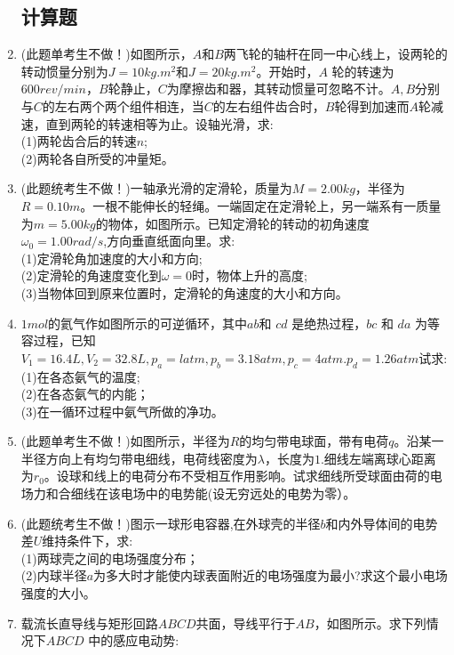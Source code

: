 \begin{enumerate}
\subsection{计算题}
\item (此题单考生不做！)如图所示，$A$和$B$两飞轮的轴杆在同一中心线上，设两轮的转动惯量分别为$J=10kg.m^2$和$J=20kg.m^2$。开始时，$A$ 轮的转速为 $600rev/min$，$B$轮静止，$C$为摩擦齿和器，其转动惯量可忽略不计。$A,B$分别与$C$的左右两个两个组件相连，当$C$的左右组件齿合时，$B$轮得到加速而$A$轮减速，直到两轮的转速相等为止。设轴光滑，求:\\
(1)两轮齿合后的转速$n$;\\
(2)两轮各自所受的冲量矩。
\item (此题统考生不做！)一轴承光滑的定滑轮，质量为$M=2.00kg$，半径为$ R=0.10m$。一根不能伸长的轻绳。一端固定在定滑轮上，另一端系有一质量为$m=5.00kg $的物体，如图所示。已知定滑轮的转动的初角速度 $\omega_0=1.00 rad/s$,方向垂直纸面向里。求:\\
(1)定滑轮角加速度的大小和方向;\\
(2)定滑轮的角速度变化到$\omega=0$时，物体上升的高度;\\
(3)当物体回到原来位置时，定滑轮的角速度的大小和方向。
\item $1 mol $的氦气作如图所示的可逆循环，其中$ ab $和 $cd$ 是绝热过程，$bc$ 和 $da$ 为等容过程，已知$V_1=16.4L,V_2=32.8L,p_a=l atm,p_b=3.18 atm,p_c=4 atm. p_d=1.26 atm $试求:\\
(1)在各态氨气的温度;\\
(2)在各态氨气的内能；\\
(3)在一循环过程中氨气所做的净功。
\item (此题单考生不做！)如图所示，半径为$R$的均匀带电球面，带有电荷$q$。沿某一半径方向上有均匀带电细线，电荷线密度为$\lambda$，长度为$1$.细线左端离球心距离为$r_0$。设球和线上的电荷分布不受相互作用影响。试求细线所受球面由荷的电场力和合细线在该电场中的电势能(设无穷远处的电势为零）。
\item (此题统考生不做！)图示一球形电容器,在外球壳的半径$b$和内外导体间的电势差$U$维持条件下，求:\\
(1)两球壳之间的电场强度分布；\\
(2)内球半径$a$为多大时才能使内球表面附近的电场强度为最小?求这个最小电场强度的大小。
\item 载流长直导线与矩形回路$ABCD$共面，导线平行于$ AB$，如图所示。求下列情况下$ABCD$ 中的感应电动势:\\


\end{enumerate}
